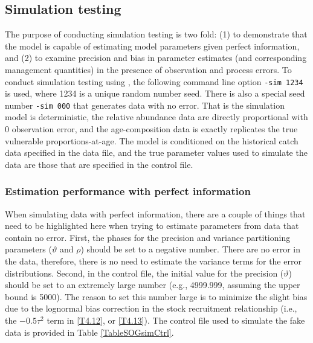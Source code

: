 	
	\subsection{Simulation testing}
	
		The purpose of conducting simulation testing is two fold: (1) to demonstrate that the model is capable of estimating model parameters given perfect information, and (2) to examine precision and bias in parameter estimates (and corresponding management quantities) in the presence of observation and process errors.  To conduct simulation testing using \iscam, the following command line option \verb"-sim 1234" is used, where 1234 is a unique random number seed.  There is also a special seed number \verb"-sim 000" that generates data with no error.  That is the simulation model is deterministic, the relative abundance data are directly proportional with 0 observation error, and the age-composition data is exactly replicates the true vulnerable proportions-at-age.  The model is conditioned on the historical catch data specified in the data file, and the true parameter values used to simulate the data are those that are specified in the control file.

	
		\subsubsection{Estimation performance with perfect information}
		 
When simulating data with perfect information, there are a couple of things that need to be highlighted here when trying to estimate parameters from data that contain no error.  First, the phases for the precision and variance partitioning parameters ($\vartheta$ and $\rho$) should be set to a negative number.  There are no error in the data, therefore, there is no need to estimate the variance terms for the error distributions.  Second, in the control file, the initial value for the precision ($\vartheta$) should be set to an extremely large number (e.g., 4999.999, assuming the upper bound is 5000).  The reason to set this number large is to minimize the slight bias due to the lognormal bias correction in the stock recruitment relationship (i.e., the $-0.5\tau^2$ term in \ref{T4.12}, or \ref{T4.13}). The control file used to simulate the fake data is provided in Table \ref{TableSOGsimCtrl}.




		
